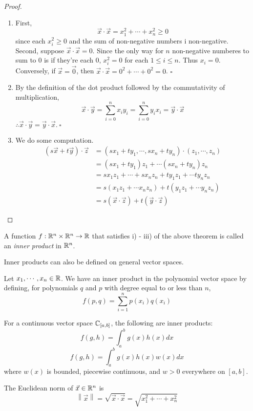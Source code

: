 \documentclass[11pt]{article}
\newcommand{\x}{\vec{x}}
\newcommand{\norm}[1]{\left\lVert #1 \right\rVert}
\newcommand{\y}{\vec{y}}
\newcommand{\z}{\vec{z}}
\begin{document}
\begin{proof} 
    \begin{enumerate}[label = (\roman*)]
        \item First, \[\x \cdot \x = x_1^2 + \cdots + x_n^2 \geq 0\] since each $x_i^2 \geq 0$ and the sum of non-negative numbers i non-negative. Second, suppose $\x \cdot \x = 0$. Since the only way for $n$ non-negative numberes to sum to 0 is if they're each 0, $x_i^2 = 0$ for each $1 \leq i \leq n$. Thus $x_i = 0$. Conversely, if $\x = \vec{0}$, then $\x \cdot \x = 0^2 + \cdots + 0^2 = 0$. $\square$
        \item By the definition of the dot product followed by the commutativity of multiplication, \[\x \cdot \y = \sum_{i=0}^{n} x_iy_i = \sum_{i=0}^{n} y_ix_i = \y \cdot \x\] $\therefore \x \cdot \y = \y \cdot \x. \ \square$
        \item We do some computation. 
        \begin{align}
            (s\x + t\y)\cdot \z &= (sx_1 + ty_1, \cdots, sx_n+ty_n) \cdot (z_1, \cdots, z_n) \\
            &= (sx_1 + ty_1)z_1 + \cdots (sx_n + ty_n)z_n \\
            &= sx_1z_1 + \cdots + sx_nz_n + ty_1z_1 + \cdots ty_nz_n \\
            &= s(x_1z_1 + \cdots x_nz_n) + t(y_1z_1 + \cdots y_nz_n) \\
            &= s(\x\cdot\z) + t(\y\cdot\z)
        \end{align}
        
    \end{enumerate}
\end{proof}

\begin{definition}
    A function $f:\mathbb{R}^n \times \mathbb{R}^n \rightarrow \mathbb{R}$ that satisfies i) - iii) of the above theorem is called an \textit{inner product} in $\mathbb{R}^n$. 
\end{definition}
\begin{remark}
    Inner products can also be defined on general vector spaces.
\end{remark}

\begin{example}
    Let $x_1, \cdots, x_n \in \mathbb{R}$. We have an inner product in the polynomial vector space by defining, for polynomials $q$ and $p$ with degree equal to or less than $n$,
    \[f(p,q) = \sum_{i=1}^{n}p(x_i)q(x_i)\] 
\end{example}
\begin{example}
    For a continuous vector space $\mathbb{C}_{[a,b]}$, the following are inner products: 
    \[f(g,h) = \int_{a}^{b} g(x)h(x) dx \]
    \[f(g,h) = \int_{a}^{b} g(x)h(x)w(x) dx \]
    where $w(x)$ is bounded, piecewise continuous, and $w > 0$ everywhere on $[a,b]$. 
\end{example}
\begin{definition}
    The Euclidean norm of $\x \in \R^n$ is \[\norm{\x} = \sqrt{\x \cdot \x} = \sqrt{x_1^2 + \cdots + x_n^2}\]
\end{definition}
\end{document}
